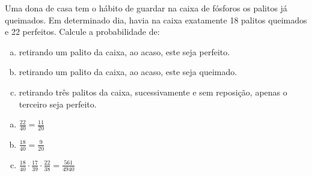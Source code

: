 \begin{ex}
Uma dona de casa tem o hábito de guardar na caixa de fósforos os palitos já queimados. Em determinado dia, havia na caixa exatamente 18 palitos queimados e 22 perfeitos. Calcule a probabilidade de:
   \begin{enumerate}[(a)]
   \item retirando um palito da caixa, ao acaso, este seja perfeito.
   \item retirando um palito da caixa, ao acaso, este seja queimado.
   \item retirando três palitos da caixa, sucessivamente e sem reposição, apenas o terceiro seja perfeito.
   \end{enumerate}
     \begin{sol}
      \phantom{A}
       \begin{enumerate} [(a)]
           \item $\frac{22}{40}=\frac{11}{20}$
           \item $\frac{18}{40}=\frac{9}{20}$
           \item $\frac{18}{40}\cdot\frac{17}{39}\cdot\frac{22}{38}=\frac{561}{4940}$
       \end{enumerate}
     \end{sol}
\end{ex}